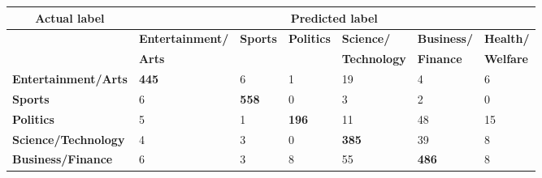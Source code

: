 \documentclass{l4proj}
\begin{document}
\begin{table}[h]
\begin{tabular}{lllllll}
\hline
\multicolumn{1}{c}{\textbf{Actual label}} & \multicolumn{6}{c}{\textbf{Predicted label}}                                                                                                                                                                                            \\ \hline
                                          & \textbf{Entertainment/}              & \textbf{Sports}                      & \textbf{Politics}                    & \textbf{Science/}                    & \textbf{Business/}                   & \textbf{Health/}                     \\
                                          & \textbf{Arts}                        & \textbf{}                            & \textbf{}                            & \textbf{Technology}                  & \textbf{Finance}                     & \textbf{Welfare}                     \\ \hline
\textbf{Entertainment/Arts}               & \cellcolor[HTML]{67FD9A}\textbf{445} & \cellcolor[HTML]{FFCCC9}6            & \cellcolor[HTML]{FFCCC9}1            & \cellcolor[HTML]{FD6864}19           & \cellcolor[HTML]{FFCCC9}4            & \cellcolor[HTML]{FFCCC9}6            \\
\textbf{Sports}                           & \cellcolor[HTML]{FFCCC9}6            & \cellcolor[HTML]{67FD9A}\textbf{558} & 0                                    & \cellcolor[HTML]{FFCCC9}3            & \cellcolor[HTML]{FFCCC9}2             & 0                                    \\
\textbf{Politics}                         & \cellcolor[HTML]{FFCCC9}5            & \cellcolor[HTML]{FFCCC9}1            & \cellcolor[HTML]{67FD9A}\textbf{196} & \cellcolor[HTML]{FD6864}11           & \cellcolor[HTML]{FE0000}48           & \cellcolor[HTML]{FD6864}15           \\
\textbf{Science/Technology}               & \cellcolor[HTML]{FFCCC9}4            & \cellcolor[HTML]{FFCCC9}3            & 0                                    & \cellcolor[HTML]{67FD9A}\textbf{385} & \cellcolor[HTML]{FE0000}39           & \cellcolor[HTML]{FFCCC9}8            \\
\textbf{Business/Finance}                 & \cellcolor[HTML]{FFCCC9}6            & \cellcolor[HTML]{FFCCC9}3            & \cellcolor[HTML]{FFCCC9}8            & \cellcolor[HTML]{FE0000}55           & \cellcolor[HTML]{67FD9A}\textbf{486} & \cellcolor[HTML]{FFCCC9}8            \\

\end{tabular}
\end{table}
\end{document}
